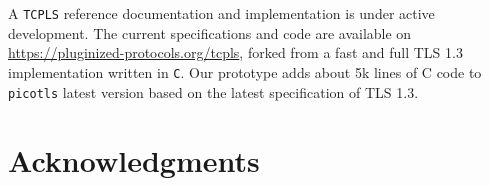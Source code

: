 A \texttt{TCPLS} reference documentation and implementation is under active development. The
current specifications and code are available on
\url{https://pluginized-protocols.org/tcpls}, forked from a fast and
full TLS 1.3 implementation written in \texttt{C}. Our \tcpls prototype adds
about 5k lines of C code to \texttt{picotls} latest version based on the latest
specification of TLS 1.3.

\section*{Acknowledgments}
